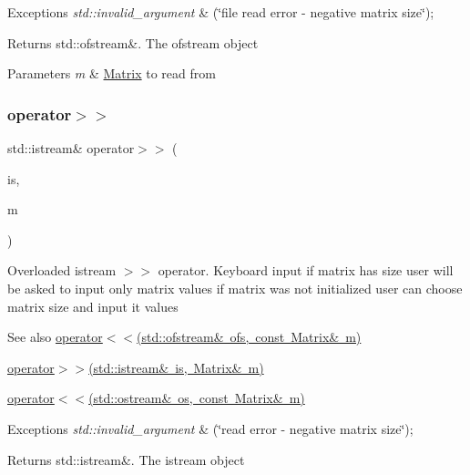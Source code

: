 \begin{DoxyExceptions}{Exceptions}
{\em std\+::invalid\+\_\+argument} & (\char`\"{}file read error -\/ negative matrix size\char`\"{}); \\
\hline
\end{DoxyExceptions}
\begin{DoxyReturn}{Returns}
std\+::ofstream\&. The ofstream object 
\end{DoxyReturn}

\begin{DoxyParams}{Parameters}
{\em m} & \mbox{\hyperlink{classMatrix}{Matrix}} to read from \\
\hline
\end{DoxyParams}
\mbox{\label{classMatrix_a3d6c1dcfc038804f4c08687f4f37f48b}} 
\subsubsection{\texorpdfstring{operator$>$$>$}{operator>>}\hspace{0.1cm}{\footnotesize\ttfamily [1/2]}}
{\footnotesize\ttfamily std\+::istream\& operator$>$$>$ (\begin{DoxyParamCaption}\item[{std\+::istream \&}]{is,  }\item[{\mbox{\hyperlink{classMatrix}{Matrix}} \&}]{m }\end{DoxyParamCaption})\hspace{0.3cm}{\ttfamily [friend]}}

Overloaded istream $>$$>$ operator. Keyboard input if matrix has size user will be asked to input only matrix values if matrix was not initialized user can choose matrix size and input it values \begin{DoxySeeAlso}{See also}
\mbox{\hyperlink{classMatrix_aa574249d63b390cf1108d6e82047ef61}{operator$<$$<$(std\+::ofstream\& ofs, const Matrix\& m)}} 

\mbox{\hyperlink{classMatrix_a3d6c1dcfc038804f4c08687f4f37f48b}{operator$>$$>$(std\+::istream\& is, Matrix\& m)}} 

\mbox{\hyperlink{classMatrix_a060711074cb5bcaf4e75498bc040c4b7}{operator$<$$<$(std\+::ostream\& os, const Matrix\& m)}} 
\end{DoxySeeAlso}

\begin{DoxyExceptions}{Exceptions}
{\em std\+::invalid\+\_\+argument} & (\char`\"{}read error -\/ negative matrix size\char`\"{}); \\
\hline
\end{DoxyExceptions}
\begin{DoxyReturn}{Returns}
std\+::istream\&. The istream object 
\end{DoxyReturn}

